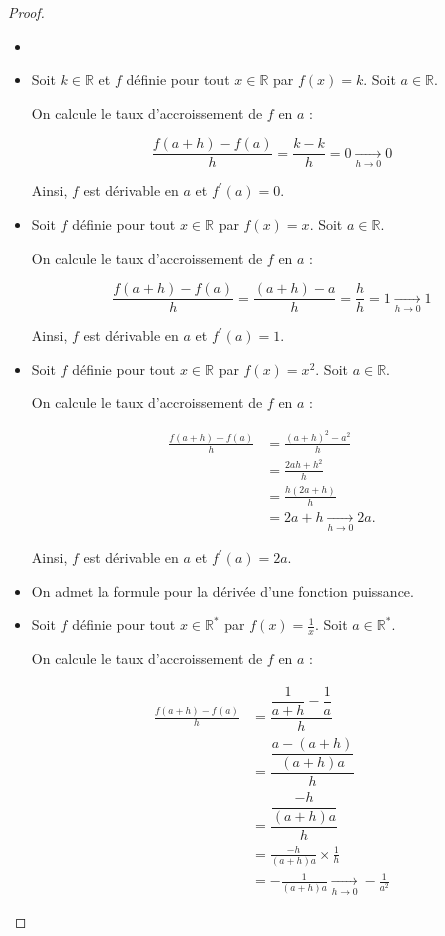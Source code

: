 \documentclass[12pt]{article}
\theoremstyle{break}
\begin{document}
\begin{proof}
\begin{itemize}
  \item[]
  \item Soit $k \in \mathbb{R}$ et $f$ définie pour tout $x \in \mathbb{R}$ par $f(x)=k$. Soit $a \in \mathbb{R}$.

On calcule le taux d'accroissement de $f$ en $a$ :

$$
\frac{f(a+h)-f(a)}{h}=\frac{k-k}{h}=0 \underset{h \rightarrow 0}{\longrightarrow} 0
$$

Ainsi, $f$ est dérivable en $a$ et $f^{\prime}(a)=0$.

  \item Soit $f$ définie pour tout $x \in \mathbb{R}$ par $f(x)=x$. Soit $a \in \mathbb{R}$.

On calcule le taux d'accroissement de $f$ en $a$ :

$$
\frac{f(a+h)-f(a)}{h}=\frac{(a+h)-a}{h}=\frac{h}{h}=1 \underset{h \rightarrow 0}{\longrightarrow} 1
$$

Ainsi, $f$ est dérivable en $a$ et $f^{\prime}(a)=1$.
\newpage
\item Soit $f$ définie pour tout $x \in \mathbb{R}$ par $f(x)=x^{2}$. Soit $a \in \mathbb{R}$.

On calcule le taux d'accroissement de $f$ en $a$ :

$$
\begin{aligned}
\frac{f(a+h)-f(a)}{h} & =\frac{(a+h)^{2}-a^{2}}{h} \\
& =\frac{2 a h+h^{2}}{h} \\
& =\frac{h(2 a+h)}{h} \\
& =2 a+h \underset{h \rightarrow 0}{\longrightarrow} 2 a .
\end{aligned}
$$

Ainsi, $f$ est dérivable en $a$ et $f^{\prime}(a)=2 a$.

  \item On admet la formule pour la dérivée d'une fonction puissance.
  \item Soit $f$ définie pour tout $x \in \mathbb{R}^{*}$ par $f(x)=\frac{1}{x}$. Soit $a \in \mathbb{R}^{*}$.

On calcule le taux d'accroissement de $f$ en $a$ :

$$
\begin{aligned}
\frac{f(a+h)-f(a)}{h} & =\dfrac{\dfrac{1}{a+h}-\dfrac{1}{a}}{h} \\
& =\dfrac{\dfrac{a-(a+h)}{(a+h) a}}{h} \\
& =\dfrac{\dfrac{-h}{(a+h) a}}{h} \\
& =\frac{-h}{(a+h) a} \times \frac{1}{h} \\
& =-\frac{1}{(a+h) a} \underset{h \rightarrow 0}{\longrightarrow}-\frac{1}{a^{2}}
\end{aligned}
$$


\end{itemize}
\end{proof}
\end{document}

